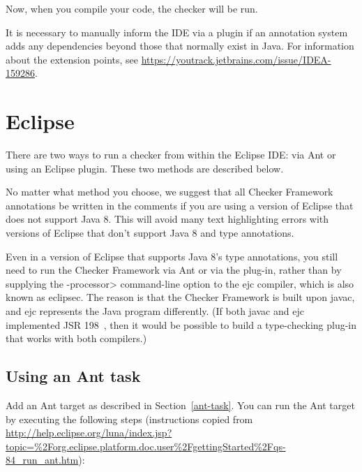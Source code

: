 Now, when you compile your code, the checker will be run.

It is necessary to manually inform the IDE via a plugin if an annotation
system adds any dependencies beyond those that normally exist in Java.
For information about the extension points, see
\url{https://youtrack.jetbrains.com/issue/IDEA-159286}.

\section{Eclipse\label{eclipse}}


There are two ways to run a checker from within the Eclipse IDE:  via Ant
or using an Eclipse plugin.  These two methods are described below.

No matter what method you choose, we suggest that
all Checker Framework annotations be written in the comments
if you are using a version of Eclipse that
does not support Java 8.  This will avoid many
text highlighting errors with versions of Eclipse that don't support Java 8
and type annotations.

Even in a version of Eclipse that supports Java 8's type annotations, you
still need to run the Checker Framework via Ant or via the plug-in, rather
than by supplying the \<-processor> command-line option to the ejc
compiler, which is also known as eclipsec.
The reason is that the Checker Framework is built upon javac,
and ejc represents the Java program differently.  (If both javac and ejc
implemented JSR 198~\cite{JSR198}, then it would be possible to build
a type-checking plug-in that works with both compilers.)


\subsection{Using an Ant task\label{eclipse-ant}}

Add an Ant target as described in Section~\ref{ant-task}.  You can
run the Ant target by executing the following steps
(instructions copied from {\codesize\url{http://help.eclipse.org/luna/index.jsp?topic=%2Forg.eclipse.platform.doc.user%2FgettingStarted%2Fqs-84_run_ant.htm}}):

